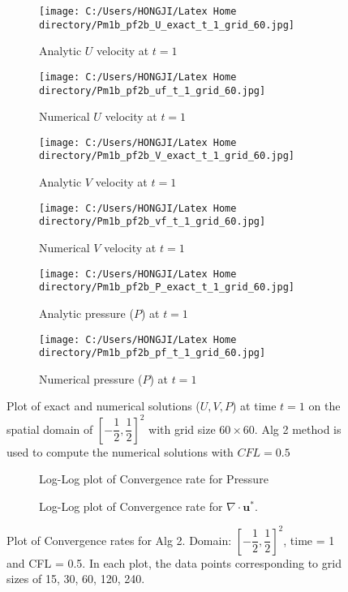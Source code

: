 \begin{figure}[H]
	\centering
	\begin{subfigure}[t]{2.5in}
		\centering
		\texttt{[image: C:/Users/HONGJI/Latex Home directory/Pm1b\_pf2b\_U\_exact\_t\_1\_grid\_60.jpg]}
		\caption{Analytic $U$ velocity at $t=1$}\label{fig:7.1a}		
	\end{subfigure}
	\quad
	\begin{subfigure}[t]{2.5in}
		\centering
		\texttt{[image: C:/Users/HONGJI/Latex Home directory/Pm1b\_pf2b\_uf\_t\_1\_grid\_60.jpg]}
		\caption{Numerical $U$ velocity at $t=1$}\label{fig:7.1b}
	\end{subfigure}
	\quad
	\begin{subfigure}[t]{2.5in}
		\centering
		\texttt{[image: C:/Users/HONGJI/Latex Home directory/Pm1b\_pf2b\_V\_exact\_t\_1\_grid\_60.jpg]}
		\caption{Analytic $V$ velocity at $t=1$}\label{fig:7.1c}
	\end{subfigure}
	\quad
	\begin{subfigure}[t]{2.5in}
		\centering
		\texttt{[image: C:/Users/HONGJI/Latex Home directory/Pm1b\_pf2b\_vf\_t\_1\_grid\_60.jpg]}
		\caption{Numerical $V$ velocity at $t=1$}\label{fig:7.1d}
	\end{subfigure}
	\quad	
	\begin{subfigure}[t]{2.5in}
		\centering
		\texttt{[image: C:/Users/HONGJI/Latex Home directory/Pm1b\_pf2b\_P\_exact\_t\_1\_grid\_60.jpg]}
		\caption{Analytic pressure ($P$) at $t=1$}\label{fig:7.1e}
	\end{subfigure}
	\quad	
	\begin{subfigure}[t]{2.5in}
		\centering
		\texttt{[image: C:/Users/HONGJI/Latex Home directory/Pm1b\_pf2b\_pf\_t\_1\_grid\_60.jpg]}
		\caption{Numerical pressure ($P$) at $t=1$}\label{fig:7.1f}
	\end{subfigure}
	\caption{Plot of exact and numerical solutions ($U,V,P$) at time $t=1$ on the spatial domain of $[-\dfrac{1}{2},\dfrac{1}{2}]^2$ with grid size $60 \times 60$. Alg 2 method is used to compute the numerical solutions with $CFL=0.5$}\label{fig:7.1}
\end{figure}

\begin{figure}[H]
	\centering
	\begin{subfigure}[t]{4.5in}
		\centering
		\caption{Log-Log plot of Convergence rate for Pressure}\label{fig:6.19a}		
	\end{subfigure}
	\quad
	\begin{subfigure}[t]{4.5in}
		\centering
		\caption{Log-Log plot of Convergence rate for $\nabla \cdot \textbf{u}^*$. }\label{fig:6.19b}
	\end{subfigure}
	\caption{Plot of Convergence rates for Alg 2. Domain:  $[-\dfrac{1}{2}, \dfrac{1}{2}]^2$, time = 1 and CFL = 0.5. In each plot, the data points corresponding to grid sizes of 15, 30, 60, 120, 240.}\label{fig:6.16}
\end{figure}

